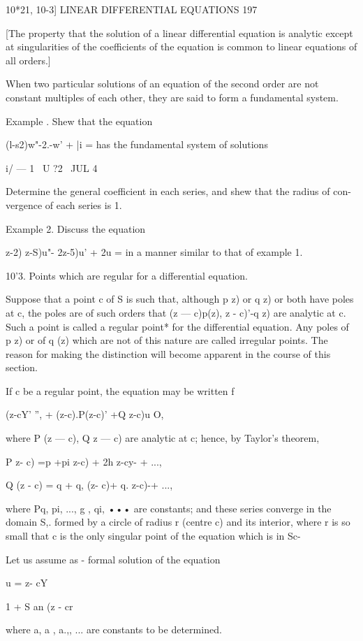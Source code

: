 10*21, 10-3] LINEAR DIFFERENTIAL EQUATIONS 197

[The property that the solution of a linear differential equation is
analytic except at singularities of the coefficients of the equation
is common to linear equations of all orders.]

When two particular solutions of an equation of the second order are
not constant multiples of each other, they are said to form a
fundamental system.

Example . Shew that the equation

(l-s2)w"-2.-w' + |i = has the fundamental system of solutions

i/ — 1 \ U ?2 \ JUL 4 \

Determine the general coefficient in each series, and shew that the
radius of con- vergence of each series is 1.

Example 2. Discuss the equation

 z-2) z-S)u"- 2z-5)u' + 2u = in a manner similar to that of example 1.

10'3. Points which are regular for a differential equation.

Suppose that a point c of S is such that, although p z) or q z) or
both have poles at c, the poles are of such orders that (z — c)p(z), z
- c)'-q z) are analytic at c. Such a point is called a regular point*
for the differential equation. Any poles of p z) or of q (z) which are
not of this nature are called irregular points. The reason for making
the distinction will become apparent in the course of this section.

If c be a regular point, the equation may be written f

(z-cY' '', + (z-c).P(z-c)' +Q z-c)u O,

where P (z — c), Q z — c) are analytic at c; hence, by Taylor's
theorem,

P z- c) =p +pi z-c) + 2h z-cy- + ...,

Q (z - c) = q + q, (z- c)+ q. z-c)-+ ...,

where Pq, pi, ..., g , qi, ••• are constants; and these series
converge in the domain S,. formed by a circle of radius r (centre c)
and its interior, where r is so small that c is the only singular
point of the equation which is in Sc-

Let us assume as - formal solution of the equation

u = z- cY

1 + S an (z - cr

where a, a , a.,, ... are constants to be determined.

